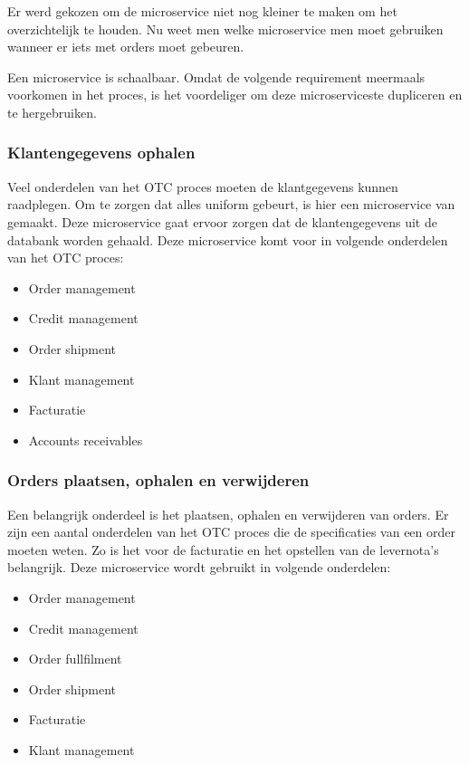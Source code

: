 Er werd gekozen om de microservice niet nog kleiner te maken om het overzichtelijk te houden. Nu weet men welke microservice men moet gebruiken wanneer er iets met orders moet gebeuren.   

Een microservice is schaalbaar. Omdat de volgende requirement meermaals voorkomen in het proces, is het voordeliger om deze microserviceste dupliceren en te hergebruiken.


\subsubsection{Klantengegevens ophalen}
Veel onderdelen van het OTC proces moeten de klantgegevens kunnen raadplegen. Om te zorgen dat alles uniform gebeurt, is hier een microservice van gemaakt.
Deze microservice gaat ervoor zorgen dat de klantengegevens uit de databank worden gehaald.
Deze microservice komt voor in volgende onderdelen van het OTC proces:
\begin{itemize}
	\item Order management
	\item Credit management
	\item Order shipment
	\item Klant management
	\item Facturatie
	\item Accounts receivables
\end{itemize}

\subsubsection{Orders plaatsen, ophalen en verwijderen}
Een belangrijk onderdeel is het plaatsen, ophalen en verwijderen van orders. Er zijn een aantal onderdelen van het OTC proces die de specificaties van een order moeten weten. Zo is het voor de facturatie en het opstellen van de levernota's belangrijk.
Deze microservice wordt gebruikt in volgende onderdelen:
\begin{itemize}
	\item Order management
	\item Credit management
	\item Order fullfilment
	\item Order shipment
	\item Facturatie
	\item Klant management
\end{itemize}

